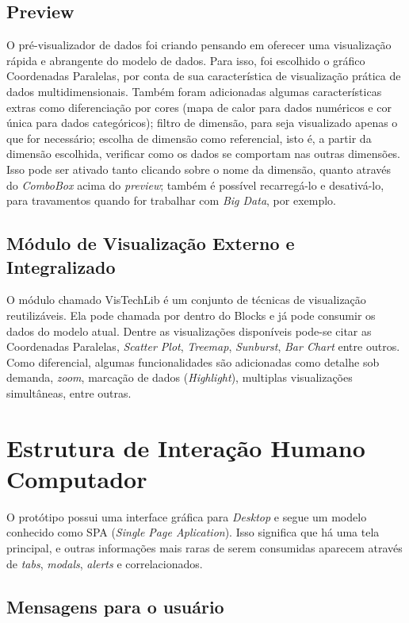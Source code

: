 \documentclass[
	12pt,				%
	openright,			%
	twoside,			%
	a4paper,			%
	english,			%
	brazil				%
	]{abntex2}
\begin{document}
		\subsection{Preview}
		O pré-visualizador de dados foi criando pensando em oferecer uma visualização rápida e abrangente do modelo de dados.
		Para isso, foi escolhido o gráfico Coordenadas Paralelas, por conta de sua característica de visualização prática de dados multidimensionais.
		Também foram adicionadas algumas características extras como diferenciação por cores (mapa de calor para dados numéricos e cor única para dados categóricos); 
			filtro de dimensão, para seja visualizado apenas o que for necessário;
			escolha de dimensão como referencial, isto é, a partir da dimensão escolhida, verificar como os dados se comportam nas outras dimensões. Isso pode ser ativado tanto clicando sobre o nome da dimensão, quanto através do \emph{ComboBox} acima do \emph{preview};
			também é possível recarregá-lo e desativá-lo, para travamentos quando for trabalhar com \emph{Big Data}, por exemplo.

		\subsection{Módulo de Visualização Externo e Integralizado}
		O módulo chamado VisTechLib é um conjunto de técnicas de visualização reutilizáveis.
		Ela pode chamada por dentro do Blocks e já pode consumir os dados do modelo atual.
		Dentre as visualizações disponíveis pode-se citar as Coordenadas Paralelas, \emph{Scatter Plot}, \emph{Treemap}, \emph{Sunburst}, \emph{Bar Chart} entre outros.
		Como diferencial, algumas funcionalidades são adicionadas como detalhe sob demanda, \emph{zoom}, marcação de dados (\emph{Highlight}), multiplas visualizações simultâneas, entre outras.
	\section{Estrutura de Interação Humano Computador}
		O protótipo possui uma interface gráfica para \emph{Desktop} e segue um modelo conhecido como SPA (\emph{Single Page Aplication}).
		Isso significa que há uma tela principal, e outras informações mais raras de serem consumidas aparecem através de \emph{tabs}, \emph{modals}, \emph{alerts} e correlacionados.
		\subsection{Mensagens para o usuário}
\end{document}
